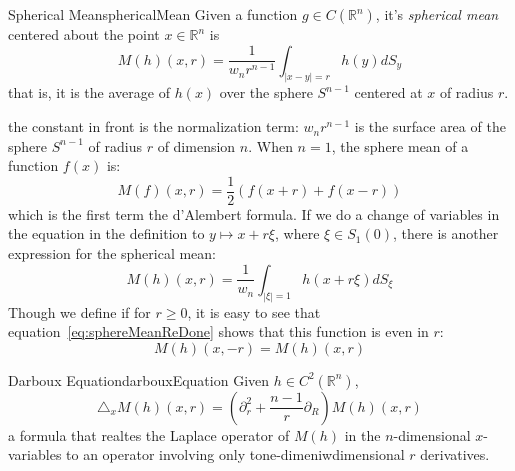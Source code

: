 \documentclass{book}
\newcommand{\R}{{\mathbb{R}}}
\begin{document}
\begin{defn}{Spherical Mean}{sphericalMean}
	Given a function $g \in C(\R^n)$, it's \emph{spherical mean} centered about the point $x \in \R^n$ is
	\[
		M(h)(x,r) = \frac{1}{w_nr^{n-1}}\int_{|x-y| = r} h(y)dS_y
	\]
	that is, it is the average of $h(x)$ over the sphere $S^{n-1}$ centered at $x$ of radius $r$.
\end{defn}

the constant in front is the normalization term: $w_nr^{n-1}$ is the surface area of the sphere $S^{n-1}$ of radius $r$
of dimension $n$. When $n = 1$, the sphere mean of a function $f(x)$ is:
\[
	M(f)(x, r) = \frac{1}{2}(f(x+r) + f(x-r))
\]
which is the first term the d'Alembert formula. If we do a change of variables in the equation in the definition to $y
\mapsto x + r\xi$, where $\xi \in S_1(0)$, there is another expression for the spherical mean:
\begin{equation}\label{eq:sphereMeanReDone}
	M(h)(x,r) = \frac{1}{w_n} \int_{|\xi| = 1}h(x + r\xi)dS_{\xi}
\end{equation}
Though we define if for $r \ge 0$, it is easy to see that equation~\ref{eq:sphereMeanReDone} shows that this function is even in $r$:
\[
	M(h)(x,-r) = M(h)(x,r)
\]

\begin{lem}{Darboux Equation}{darbouxEquation}
	Given $h \in C^2(\R^n)$,
	\[
		\triangle_x M(h)(x,r) = (\partial_r^2 + \frac{n-1}{r}  \partial_R)M(h)(x,r)
	\]
	a formula that realtes the Laplace operator of $M(h)$ in the $n$-dimensional $x$-variables to an operator involving
	only tone-dimeniwdimensional $r$ derivatives.
\end{lem}
\end{document}
